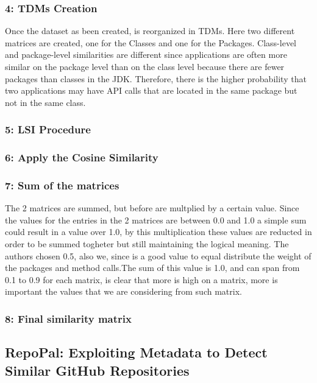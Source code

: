 \subsubsection{4: TDMs Creation}
Once the dataset as been created, is reorganized in TDMs. Here two different matrices are created, one for the Classes and one for the Packages. Class-level and package-level similarities are different since applications are often more similar on the package level than on the class level because there are fewer packages than classes in the JDK. Therefore, there is the higher probability that two applications may have API calls that are located in the same package but not in the same class.

\subsubsection{5: LSI Procedure}

\subsubsection{6: Apply the Cosine Similarity}

\subsubsection{7: Sum of the matrices}
The 2 matrices are summed, but before are multplied by a certain value. Since the values for the entries in the 2 matrices are between 0.0 and 1.0 a simple sum could result in a value over 1.0, by this multiplication these values are reducted in order to be summed togheter but still maintaining the logical meaning. The authors chosen 0.5, also we, since is a good value to equal distribute the weight of the packages and method calls.The sum of this value is 1.0, and can span from 0.1 to 0.9 for each matrix, is clear that more is high on a matrix, more is important the values that we are considering from such matrix.

\subsubsection{8: Final similarity matrix}
\clearpage



\subsection{RepoPal: Exploiting Metadata to Detect Similar GitHub Repositories}\label{sec:repopal}

